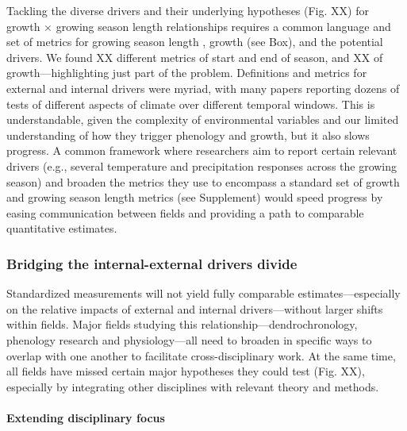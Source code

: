 \documentclass[11pt]{article}
\begin{document}
Tackling the diverse drivers and their underlying hypotheses (Fig. XX) for growth $\times$ growing season length relationships requires a common language and set of metrics for growing season length \citep{korner2023four}, growth (see Box), and the potential drivers. We found XX different metrics of start and end of season, and XX of growth---highlighting just part of the problem. Definitions and metrics for external and internal drivers were myriad, with many papers reporting dozens of tests of different aspects of climate over different temporal windows. This is understandable, given the complexity of environmental variables and our limited understanding of how they trigger phenology and growth, but it also slows progress. A common framework where researchers aim to report certain relevant drivers (e.g., several temperature and precipitation responses across the growing season) and broaden the metrics they use to encompass a standard set of growth and growing season length metrics (see Supplement) would speed progress by easing communication between fields and providing a path to comparable quantitative estimates. %

\subsubsection*{Bridging the internal-external drivers divide}

Standardized measurements will not yield fully comparable estimates---especially on the relative impacts of external and internal drivers---without larger shifts within fields. Major fields studying this relationship---dendrochronology, phenology research and physiology---all need to broaden in specific ways to overlap with one another to facilitate cross-disciplinary work. At the same time, all fields have missed certain major hypotheses they could test (Fig. XX), especially by integrating other disciplines with relevant theory and methods. 

\paragraph{Extending disciplinary focus} 
\end{document}
